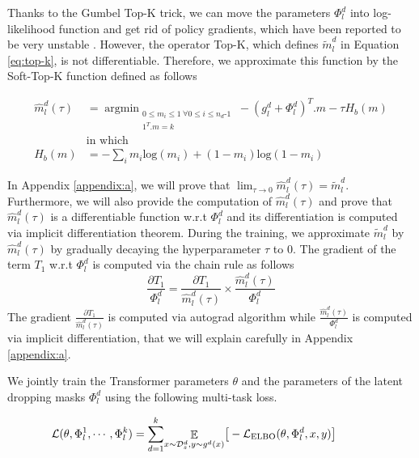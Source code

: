\documentclass[11pt]{article}
\begin{document}
Thanks to the Gumbel Top-K trick, we can move the parameters $\Phi_l^d$ into log-likelihood function and get rid of policy gradients, which have been reported to be very unstable \citep{Diederick14auto}. However, the operator Top-K, which defines $\tilde{m}_l^d$ in Equation \eqref{eq:top-k}, is not differentiable. Therefore, we approximate this function by the Soft-Top-K function defined as follows

\begin{align}
\hat{m}_l^d(\tau) &= \displaystyle{\mathop{argmin}_{\substack{
       0 \leqslant m_i \leqslant 1 \ \forall 0 \leqslant i \leqslant n_d\text{-}1 \label{eq:soft-top-k}\\
        1^{T}.m = k
      }}} -(g_l^d+\Phi_l^d)^{T} . m - \tau H_b(m) \\
& \text{in which} \nonumber \\
H_b(m) &= - \sum_i m_i \text{log}(m_i) + (1-m_i)\text{log}(1-m_i) \nonumber 
\end{align}

In Appendix \ref{appendix:a}, we will prove that $\lim_{\tau \rightarrow 0}\hat{m}_l^d(\tau) = \tilde{m}_l^d$. Furthermore, we will also provide the computation of $\hat{m}_l^d(\tau)$ and prove that $\hat{m}_l^d(\tau)$ is a differentiable function w.r.t $\Phi_l^d$ and its differentiation is computed via implicit differentiation theorem. During the training, we approximate $\tilde{m}_l^d$ by $\hat{m}_l^d(\tau)$ by gradually decaying the hyperparameter $\tau$ to $0$. The gradient of the term $T_1$ w.r.t $\Phi_l^d$ is computed via the chain rule as follows
\begin{equation}
\frac{\partial T_1}{\Phi_l^d} = \frac{\partial T_1}{\hat{m}_l^d(\tau)} \times \frac{\hat{m}_l^d(\tau)}{\Phi_l^d}
\end{equation}
The gradient $\frac{\partial T_1}{\hat{m}_l^d(\tau)}$ is computed via autograd algorithm while $\frac{\hat{m}_l^d(\tau)}{\Phi_l^d}$ is computed via implicit differentiation, that we will explain carefully in Appendix \ref{appendix:a}.

We jointly train the Transformer parameters $\theta$ and the parameters of the latent dropping masks $\Phi_l^d$ using the following multi-task loss.

\begin{align}
\hspace{-3.em}
\mathcal{L}(\theta,\Phi_l^1,\cdots,\Phi_l^k) = \displaystyle{\mathop{\sum}_{d=1}^{k}} \displaystyle{\mathop{\mathbb{E}}_{x \sim \mathcal{D}_s^d,y \sim g^d(x)}} \big[-\mathcal{L}_{\text{ELBO}}(\theta,\Phi_l^d,x,y)\big]
\end{align}
\end{document}
